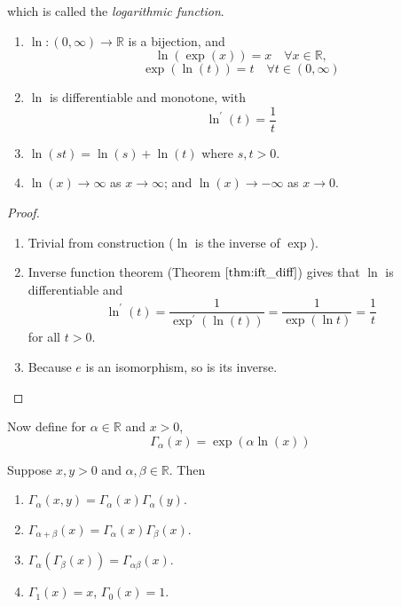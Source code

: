 \documentclass[10pt, a4paper, twoside]{report}
\begin{document}
which is called the \emph{logarithmic function}. 
\begin{theorem} \item[]
    \begin{enumerate}
        \item \(\ln:(0,\infty)\to\mathbb{R}\) is a bijection, and 
        \[\ln(\exp(x))=x\quad\forall x\in\mathbb{R},\]
        \[\exp(\ln(t))=t\quad\forall t\in(0,\infty)\]
        \item \(\ln\) is differentiable and monotone, with 
        \[\ln^\prime(t)=\frac 1t\]
        \item \(\ln(st)=\ln(s)+\ln(t)\) where \(s,t>0\).
        \item \(\ln(x)\to\infty\) as \(x\to\infty\); and \(\ln(x)\to-\infty\) as \(x\to 0\).
    \end{enumerate}
    \label{thm:ln_property}
\end{theorem}
\begin{proof} \item[]
    \begin{enumerate}
        \item Trivial from construction (\(\ln\) is the inverse of \(\exp\)).
        \item Inverse function theorem (Theorem \(\ref{thm:ift_diff}\)) gives that \(\ln\) is differentiable and 
        \[\ln^\prime(t)=\frac{1}{\exp^\prime(\ln(t))}=\frac 1{\exp(\ln{t})}=\frac 1t\]
        for all \(t>0\).
        \item Because \(e\) is an isomorphism, so is its inverse.
    \end{enumerate}
\end{proof}
Now define for \(\alpha\in\mathbb{R}\) and \(x>0\),
\[\Gamma_\alpha(x)=\exp(\alpha\ln(x))\]
\begin{theorem}
    Suppose \(x,y>0\) and \(\alpha,\beta\in\mathbb{R}\). Then 
    \begin{enumerate}
        \item \(\Gamma_\alpha(x,y)=\Gamma_\alpha(x)\Gamma_\alpha(y)\).
        \item \(\Gamma_{\alpha+\beta}(x)=\Gamma_\alpha(x)\Gamma_\beta(x)\).
        \item \(\Gamma_\alpha(\Gamma_\beta(x))=\Gamma_{\alpha\beta}(x)\).
        \item \(\Gamma_1(x)=x\), \(\Gamma_0(x)=1\).
    \end{enumerate}
    \label{thm:power_property}
\end{theorem}
\end{document}
